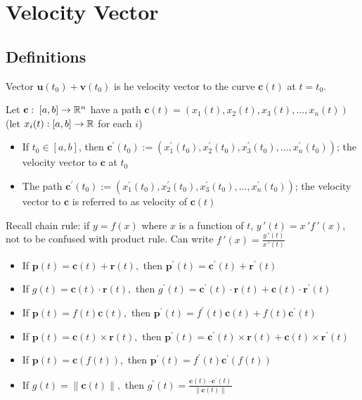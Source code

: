 \section{Velocity Vector}

\subsection{Definitions}

Vector $\textbf{u}(t_0)+\textbf{v}(t_0)$ is he velocity vector to the curve $\textbf{c}(t)$ at $t=t_0$.\newline

\noindent
Let $\textbf{c}:\;[a,b]\rightarrow \mathbb{R}^n$ have a path $\textbf{c}(t)=\left(x_{1}(t), x_{2}(t), x_{3}(t), \ldots, x_{n}(t)\right)$ (let $x_i(t):[a,b]\rightarrow \mathbb{R}$ for each $i$)
\begin{itemize}
    \item If $t_0\in[a,b]$, then $\textbf{c}^{\prime}\left(t_{0}\right):=\left(x_{1}^{\prime}\left(t_{0}\right), x_{2}^{\prime}\left(t_{0}\right), x_{3}^{\prime}\left(t_{0}\right), \ldots, x_{n}^{\prime}\left(t_{0}\right)\right)$; the velocity vector to $\textbf{c}$ at $t_0$
    \item The path $\textbf{c}^{\prime}\left(t_{0}\right):=\left(x_{1}^{\prime}\left(t_{0}\right), x_{2}^{\prime}\left(t_{0}\right), x_{3}^{\prime}\left(t_{0}\right), \ldots, x_{n}^{\prime}\left(t_{0}\right)\right)$; the velocity vector to $\textbf{c}$ is referred to as velocity of $\textbf{c}(t)$
\end{itemize}

Recall chain rule: if $y=f(x)$ where $x$ is a function of $t$, $y\,'(t)=x\,'f\,'(x)$, not to be confused with product rule.
Can write $f\,'(x)=\frac{y\,'(t)}{x\,'(t)}$

\begin{itemize}
    \item If $\textbf{p}(t)=\textbf{c}(t)+\textbf{r}(t),$ then $\textbf{p}^{\prime}(t)=\textbf{c}^{\prime}(t)+\textbf{r}^{\prime}(t)$
    \item If $g(t)=\textbf{c}(t) \cdot \textbf{r}(t),$ then $g^{\prime}(t)=\textbf{c}^{\prime}(t) \cdot \textbf{r}(t)+\textbf{c}(t) \cdot \textbf{r}^{\prime}(t)$
    \item If $\textbf{p}(t)=f(t) \textbf{c}(t),$ then $\textbf{p}^{\prime}(t)=f^{\prime}(t) \textbf{c}(t)+f(t) \textbf{c}^{\prime}(t)$
    \item If $\textbf{p}(t)=\textbf{c}(t) \times \textbf{r}(t),$ then $\textbf{p}^{\prime}(t)=\textbf{c}^{\prime}(t) \times \textbf{r}(t)+\textbf{c}(t) \times \textbf{r}^{\prime}(t)$
    \item If $\textbf{p}(t)=\textbf{c}(f(t)),$ then $\textbf{p}^{\prime}(t)=f^{\prime}(t) \textbf{c}^{\prime}(f(t))$
    \item If $g(t)=\|\textbf{c}(t)\|,$ then $g^{\prime}(t)=\frac{\textbf{c}(t) \cdot \textbf{c}^{\prime}(t)}{\|\textbf{c}(t)\|}$
\end{itemize}


